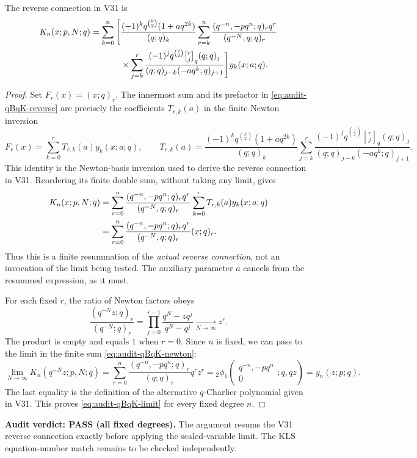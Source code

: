 \documentclass[11pt]{article}
\begin{document}
\noindent The reverse connection in V31 is
\begin{align}\label{eq:audit-qBqK-reverse}
 K_n(x;p,N;q)=\sum_{k=0}^n\Bigg[&
 \frac{(-1)^kq^{\binom{k}{2}}(1+aq^{2k})}{(q;q)_k}
 \sum_{r=k}^n\frac{(q^{-n},-pq^n;q)_rq^r}
 {(q^{-N},q;q)_r}\notag\\
 &\times\sum_{j=k}^r
 \frac{(-1)^jq^{\binom j2}{r\brack j}_q(q;q)_j}
 {(q;q)_{j-k}(-aq^k;q)_{j+1}}
 \Bigg]y_k(x;a;q).
\end{align}
\begin{proof}
Set $F_r(x)=(x;q)_r$. The innermost sum and its prefactor in
\eqref{eq:audit-qBqK-reverse} are precisely the coefficients $T_{r,k}(a)$ in the finite Newton inversion
\begin{equation}\label{eq:audit-qBqK-inversion}
 F_r(x)=\sum_{k=0}^r T_{r,k}(a)y_k(x;a;q),\qquad
 T_{r,k}(a)=\frac{(-1)^kq^{\binom{k}{2}}(1+aq^{2k})}{(q;q)_k}
 \sum_{j=k}^r\frac{(-1)^jq^{\binom j2}{r\brack j}_q(q;q)_j}
 {(q;q)_{j-k}(-aq^k;q)_{j+1}}.
\end{equation}
This identity is the Newton-basis inversion used to derive the reverse connection in V31. Reordering its finite double sum, without taking any limit, gives
\begin{align}\label{eq:audit-qBqK-newton}
 K_n(x;p,N;q)
 &=\sum_{r=0}^n \frac{(q^{-n},-pq^n;q)_r q^r}
 {(q^{-N},q;q)_r} \sum_{k=0}^r T_{r,k}(a)y_k(x;a;q)\notag\\
 &=\sum_{r=0}^n \frac{(q^{-n},-pq^n;q)_r q^r}
 {(q^{-N},q;q)_r}(x;q)_r.
\end{align}
Thus this is a finite resummation of the \emph{actual reverse connection}, not an invocation of the limit being tested. The auxiliary parameter $a$ cancels from the resummed expression, as it must.

For each fixed $r$, the ratio of Newton factors obeys
\[
\frac{(q^{-N}z;q)_r}{(q^{-N};q)_r}
=\prod_{j=0}^{r-1}\frac{q^N-zq^j}{q^N-q^j}
\xrightarrow[N\to\infty]{}z^r.
\]
The product is empty and equals $1$ when $r=0$. Since $n$ is fixed, we can pass to the limit in the finite sum \eqref{eq:audit-qBqK-newton}:
\[
\lim_{N\to\infty}K_n(q^{-N}z;p,N;q)
=\sum_{r=0}^n\frac{(q^{-n},-pq^n;q)_r}{(q;q)_r}q^r z^r
={}_2\phi_1\!\left(\begin{matrix}q^{-n},-pq^n\\0\end{matrix};q,qz\right)
=y_n(z;p;q).
\]
The last equality is the definition of the alternative $q$-Charlier polynomial given in V31. This proves \eqref{eq:audit-qBqK-limit} for every fixed degree $n$.
\end{proof}
\noindent\textbf{Audit verdict: PASS (all fixed degrees).} The argument resums the V31 reverse connection exactly before applying the scaled-variable limit. The KLS equation-number match remains to be checked independently.
\end{document}
